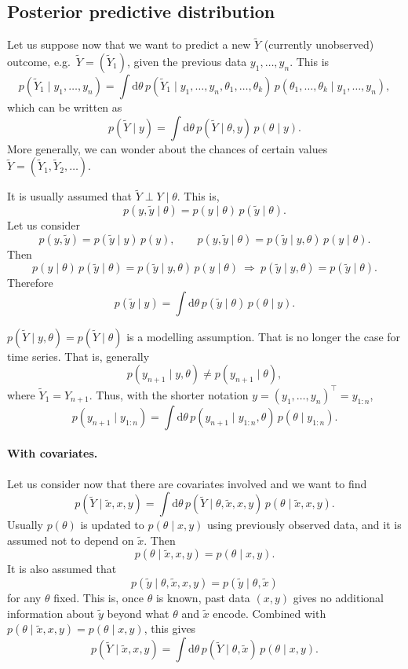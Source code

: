 \subsection{Posterior predictive distribution}
Let us suppose now that we want to predict a new $\tilde Y$ (currently unobserved) outcome, e.g.\ $\tilde Y = (\tilde Y_1)$, given the previous data $y_1, \dots, y_n$. This is
\[
p(\tilde Y_1 \mid y_1, \dots, y_n) = \int \mathrm{d}\theta\,p(\tilde Y_1 \mid y_1, \dots, y_n, \theta_1, \dots, \theta_k)\,p(\theta_1, \dots, \theta_k \mid y_1, \dots, y_n),
\]
which can be written as
\[
p(\tilde Y \mid y) = \int \mathrm{d}\theta\,p(\tilde Y \mid \theta, y)\,p(\theta \mid y).
\]
More generally, we can wonder about the chances of certain values $\tilde Y = (\tilde Y_1, \tilde Y_2, \dots)$.

It is usually assumed that $\tilde Y \perp Y \mid \theta$. This is,
\[
p(y, \tilde y \mid \theta) = p(y \mid \theta)\,p(\tilde y \mid \theta).
\]
Let us consider
\[
p(y, \tilde y) = p(\tilde y \mid y)\,p(y), \qquad p(y, \tilde y \mid \theta) = p(\tilde y \mid y, \theta)\,p(y \mid \theta).
\]
Then
\[
p(y \mid \theta)\,p(\tilde y \mid \theta) = p(\tilde y \mid y, \theta)\,p(y \mid \theta)
\ \Rightarrow\
p(\tilde y \mid y, \theta) = p(\tilde y \mid \theta).
\]
Therefore
\[
p(\tilde y \mid y) = \int \mathrm{d}\theta\,p(\tilde y \mid \theta)\,p(\theta \mid y).
\]

\begin{remark}
$p(\tilde Y \mid y, \theta) = p(\tilde Y \mid \theta)$ is a modelling assumption. That is no longer the case for time series. That is, generally
\[
p(y_{n+1} \mid y, \theta) \neq p(y_{n+1} \mid \theta),
\]
where $\tilde Y_1 = Y_{n+1}$. Thus, with the shorter notation $y = (y_1, \dots, y_n)^{\top} = y_{1:n}$,
\[
p(y_{n+1} \mid y_{1:n}) = \int \mathrm{d}\theta\,p(y_{n+1} \mid y_{1:n}, \theta)\,p(\theta \mid y_{1:n}).
\]
\end{remark}

\paragraph{With covariates.}
Let us consider now that there are covariates involved and we want to find
\[
p(\tilde Y \mid \tilde x, x, y) = \int \mathrm{d}\theta\,p(\tilde Y \mid \theta, \tilde x, x, y)\,p(\theta \mid \tilde x, x, y).
\]
Usually $p(\theta)$ is updated to $p(\theta \mid x, y)$ using previously observed data, and it is assumed not to depend on $\tilde x$. Then
\[
p(\theta \mid \tilde x, x, y) = p(\theta \mid x, y).
\]
It is also assumed that
\[
p(\tilde y \mid \theta, \tilde x, x, y) = p(\tilde y \mid \theta, \tilde x)
\]
for any $\theta$ fixed. This is, once $\theta$ is known, past data $(x, y)$ gives no additional information about $\tilde y$ beyond what $\theta$ and $\tilde x$ encode. Combined with $p(\theta \mid \tilde x, x, y) = p(\theta \mid x, y)$, this gives
\[
p(\tilde Y \mid \tilde x, x, y) = \int \mathrm{d}\theta\,p(\tilde Y \mid \theta, \tilde x)\,p(\theta \mid x, y).
\]

